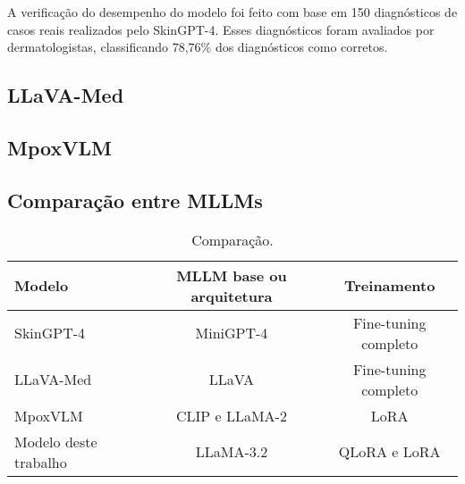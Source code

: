 A verificação do desempenho do modelo foi feito com base em 150 diagnósticos de casos reais realizados pelo Skin\ac{GPT}-4. Esses diagnósticos foram avaliados por
dermatologistas, classificando 78,76\% dos diagnósticos como corretos.

\subsection{LLaVA-Med}

\subsection{MpoxVLM}

\subsection{Comparação entre MLLMs}

\begin{table}[ht]
    \caption{\small Comparação.}
    \centering
    \begin{tabular}{l|cc}
        \hline
        Modelo                & MLLM base ou arquitetura & Treinamento          \\ \hline
        SkinGPT-4             & MiniGPT-4                & Fine-tuning completo \\
        LLaVA-Med             & LLaVA                    & Fine-tuning completo \\
        MpoxVLM               & CLIP e LLaMA-2           & LoRA                 \\
        Modelo deste trabalho & LLaMA-3.2                & QLoRA e LoRA         \\ \hline
    \end{tabular}
    \label{tab:mllm_comparison}
\end{table}